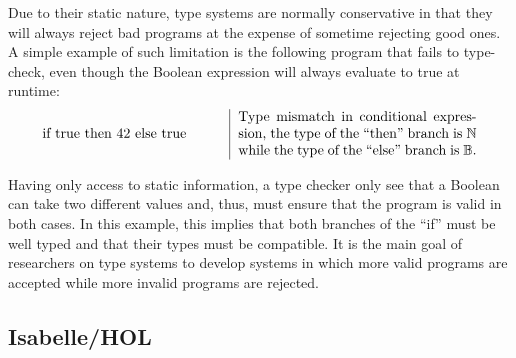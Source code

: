 Due to their static nature, type systems are normally conservative in that they will always reject
bad programs at the expense of sometime rejecting good ones. A simple example of such limitation is
the following program that fails to type-check, even though the Boolean expression will always
evaluate to true at runtime:
\begin{displaymath}
  \begin{tabular}{m{4.5cm} | m{6cm}}
    if true then 42 else true
    & Type mismatch in conditional expression, the type of the ``then'' branch is $\mathbb{N}$ while
    the type of the ``else'' branch is $\mathbb{B}$.
  \end{tabular}
\end{displaymath}

Having only access to static information, a type checker only see that a Boolean can take two
different values and, thus, must ensure that the program is valid in both cases. In this example,
this implies that both branches of the ``if'' must be well typed and that their types must be
compatible. It is the main goal of researchers on type systems to develop systems in which more
valid programs are accepted while more invalid programs are rejected.

\subsection{Isabelle/HOL}


